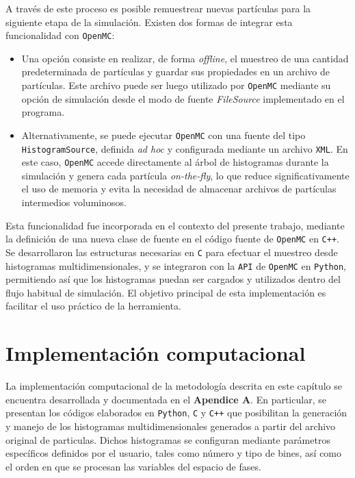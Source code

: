 

A través de este proceso es posible remuestrear nuevas partículas para la siguiente etapa de la simulación. Existen dos formas de integrar esta funcionalidad con \texttt{OpenMC}:

\begin{itemize}
    \item Una opción consiste en realizar, de forma \emph{offline}, el muestreo de una cantidad predeterminada de partículas y guardar sus propiedades en un archivo de partículas. Este archivo puede ser luego utilizado por \texttt{OpenMC} mediante su opción de simulación desde el modo de fuente \textit{FileSource} implementado en el programa.
    
    \item Alternativamente, se puede ejecutar \texttt{OpenMC} con una fuente del tipo \texttt{HistogramSource}, definida \textit{ad hoc} y configurada mediante un archivo \texttt{XML}. En este caso, \texttt{OpenMC} accede directamente al árbol de histogramas durante la simulación y genera cada partícula \emph{on-the-fly}, lo que reduce significativamente el uso de memoria y evita la necesidad de almacenar archivos de partículas intermedios voluminosos.
\end{itemize}

Esta funcionalidad fue incorporada en el contexto del presente trabajo, mediante la definición de una nueva clase de fuente en el código fuente de \texttt{OpenMC} en \texttt{C++}. Se desarrollaron las estructuras necesarias en \texttt{C} para efectuar el muestreo desde histogramas multidimensionales, y se integraron con la \texttt{API} de \texttt{OpenMC} en \texttt{Python}, permitiendo así que los histogramas puedan ser cargados y utilizados dentro del flujo habitual de simulación. El objetivo principal de esta implementación es facilitar el uso práctico de la herramienta.


\section{Implementación computacional}

La implementación computacional de la metodología descrita en este capítulo se encuentra desarrollada y documentada en el \textbf{Apendice A}. En particular, se presentan los códigos elaborados en \texttt{Python}, \texttt{C} y \texttt{C++} que posibilitan la generación y manejo de los histogramas multidimensionales generados a partir del archivo original de particulas. Dichos histogramas se configuran mediante parámetros específicos definidos por el usuario, tales como número y tipo de bines, así como el orden en que se procesan las variables del espacio de fases.

